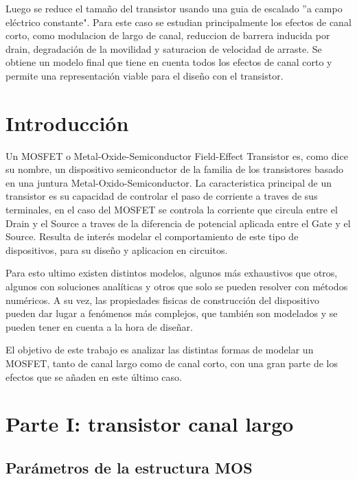 \documentclass[a4paper, twoside, 10pt, spanish]{article}
\numberwithin{table}{section}
\begin{document}
\quad Luego se reduce el tamaño del transistor usando una guia de escalado ''a campo eléctrico constante". Para este caso se estudian principalmente los efectos de canal corto, como modulacion de largo de canal, reduccion de barrera inducida por drain, degradación de la movilidad y saturacion de velocidad de arraste. Se obtiene un modelo final que tiene en cuenta todos los efectos de canal corto y permite una representación viable para el diseño con el transistor. 
\section{Introducción}

\quad Un MOSFET o Metal-Oxide-Semiconductor Field-Effect Transistor es, como dice su nombre, un dispositivo semiconductor de la familia de los transistores basado en una juntura Metal-Oxido-Semiconductor. La caracteristica principal de un transistor es su capacidad de controlar el paso de corriente a traves de sus terminales, en el caso del MOSFET se controla la corriente que circula entre el Drain y el Source a traves de la diferencia de potencial aplicada entre el Gate y el Source. Resulta de interés modelar el comportamiento de este tipo de dispositivos, para su diseño y aplicacion en circuitos.

\quad Para esto ultimo existen distintos modelos, algunos más exhaustivos que otros, algunos con soluciones analíticas y otros que solo se pueden resolver con métodos numéricos. A su vez, las propiedades fisicas de construcción del dispositivo pueden dar lugar a fenómenos más complejos, que también son modelados y se pueden tener en cuenta a la hora de diseñar. 

\quad El objetivo de este trabajo es analizar las distintas formas de modelar un MOSFET, tanto de canal largo como de canal corto, con una gran parte de los efectos que se añaden en este último caso. 


\section{Parte I: transistor canal largo}

\subsection{Parámetros de la estructura MOS}
\end{document}
